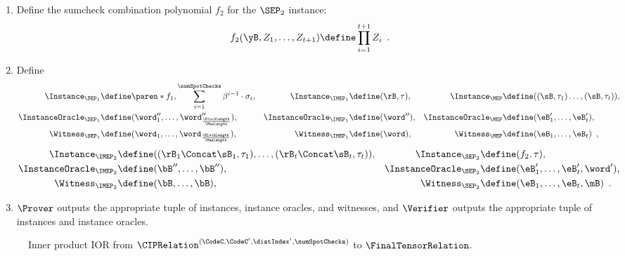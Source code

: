\begin{tcolorbox}[breakable, enhanced, colback=white, boxrule=0.65pt]
\begin{enumerate}[nolistsep]
\begin{align*}
        \end{align*}
        \item Define the sumcheck combination polynomial $f_2$ for the $\SEP_2$ instance:
        \begin{align*}
            f_2(\yB, Z_1, \dotsc, Z_{t+1}) \define \prod_{i=1}^{t+1} Z_i \enspace.
        \end{align*}
        \item Define
        \begin{align*}
            \Instance_{\SEP_1} &\define \paren*{f_1, \sum_{i=1}^{\numSpotChecks} \beta^{i-1} \cdot \sigma_i},
            & \Instance_{\IMEP_1} &\define (\rB, \tau),
            & \Instance_{\MEP} &\define ((\sB, \tau_1) \dotsc, (\sB, \tau_{t})), \\
            \InstanceOracle_{\SEP_1} &\define (\word''_1, \dotsc, \word''_{\frac{\BlockLength}{\MesLength}}),
            & \InstanceOracle_{\IMEP_1} &\define (\word''),
            & \InstanceOracle_{\MEP} &\define (\eB'_1, \dotsc, \eB'_{t}) , \\
            \Witness_{\SEP_1} &\define (\word_1, \dotsc, \word_{\frac{\BlockLength}{\MesLength}}),
            & \Witness_{\IMEP_1} &\define (\word),
            & \Witness_{\MEP} &\define (\eB_1, \dotsc, \eB_{t}) \enspace,
        \end{align*}
        \begin{align*}
            \Instance_{\IMEP_2} &\define ((\rB_1 \Concat \sB_1, \tau_1), \dotsc, (\rB_{t} \Concat \sB_{t}, \tau_{t})),
            & \Instance_{\SEP_2} &\define (f_2, \tau), \\
            \InstanceOracle_{\IMEP_2} &\define (\bB'', \dotsc, \bB''),
            & \InstanceOracle_{\SEP_2} &\define (\eB'_1, \dotsc, \eB'_{t}, \word'), \\
            \Witness_{\IMEP_2} &\define (\bB, \dotsc, \bB),
            & \Witness_{\SEP_2} &\define (\eB_1, \dotsc, \eB_{t}, \mB) \enspace.
        \end{align*}
        \item $\Prover$ outputs the appropriate tuple of instances, instance oracles, and witnesses, and $\Verifier$ outputs the appropriate tuple of instances and instance oracles.
    \end{enumerate}
    \end{tcolorbox}
\begin{figure}[H]
    \vspace{-10pt}
    \caption{Inner product IOR from $\CIPRelation^{(\CodeC, \CodeC', \distIndex', \numSpotChecks)}$ to $\FinalTensorRelation$.} \label{alg:cip-to-sep}
\end{figure}